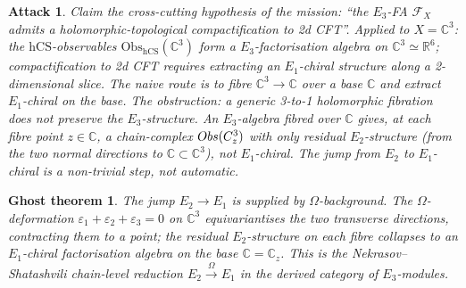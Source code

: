 \documentclass[11pt]{article}
\newtheorem*{ghost}{Ghost theorem}
\newtheorem*{attack}{Attack}
\providecommand{\Eone}{E_1}
\providecommand{\Etwo}{E_2}
\providecommand{\Ethree}{E_3}
\providecommand{\C}{\mathbb{C}}
\providecommand{\R}{\mathbb{R}}
\providecommand{\cF}{\mathcal{F}}
\providecommand{\hCS}{\mathrm{hCS}}
\providecommand{\Obs}{\mathrm{Obs}}
\begin{document}
\begin{attack}
Claim the cross-cutting hypothesis of the mission: ``the $\Ethree$-FA
$\cF_X$ admits a holomorphic-topological compactification to 2d CFT''.
Applied to $X = \C^3$: the $\hCS$-observables $\Obs_{\hCS}(\C^3)$ form
a $\Ethree$-factorisation algebra on $\C^3 \simeq \R^6$; compactification
to 2d CFT requires extracting an $\Eone$-chiral structure along a
2-dimensional slice. The naive route is to fibre $\C^3 \to \C$ over a
base $\C$ and extract $\Eone$-chiral on the base. The obstruction: a
generic 3-to-1 holomorphic fibration does \emph{not} preserve the
$\Ethree$-structure. An $\Ethree$-algebra fibred over $\C$ gives, at
each fibre point $z \in \C$, a chain-complex $\Obs(\cC^3_z)$ with only
\emph{residual} $\Etwo$-structure (from the two normal directions to
$\C\subset\C^3$), not $\Eone$-chiral. The jump from $\Etwo$ to
$\Eone$-chiral is a non-trivial step, not automatic.
\end{attack}

\begin{ghost}
\emph{The jump $\Etwo \to \Eone$ is supplied by $\Omega$-background.
The $\Omega$-deformation $\varepsilon_1 + \varepsilon_2 + \varepsilon_3
= 0$ on $\C^3$ equivariantises the two transverse directions,
contracting them to a point; the residual $\Etwo$-structure on each
fibre collapses to an $\Eone$-chiral factorisation algebra on the base
$\C = \C_z$. This is the Nekrasov--Shatashvili chain-level reduction
$\Etwo \xrightarrow{\Omega}\Eone$ in the derived category of
$\Ethree$-modules.}
\end{ghost}
\end{document}
